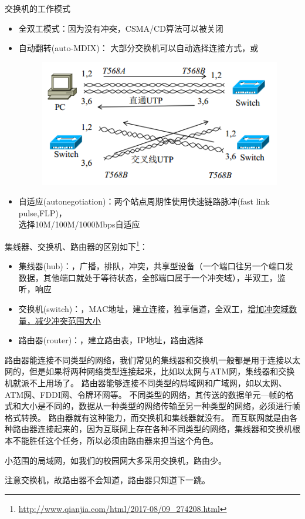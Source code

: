 \myhline
交换机的工作模式
\begin{itemize}
\item 全双工模式：因为没有冲突，CSMA/CD算法可以被关闭
\item 自动翻转(auto-MDIX)：
大部分交换机可以自动选择连接方式，或
\begin{figure}[H]
	\centering
	\includegraphics[width=0.5\linewidth]{fig/auto-MDIX.png}
\end{figure}
\item 自适应(autonegotiation)：两个站点周期性使用快速链路脉冲(fast link pulse,FLP)，\\
选择10M/100M/1000Mbps自适应
\end{itemize}

\myhline
集线器、交换机、路由器的区别如下\footnote{\url{http://www.qianjia.com/html/2017-08/09_274208.html}}：
\begin{itemize}
	\item 集线器(hub)：，广播，排队，冲突，共享型设备（一个端口往另一个端口发数据，其他端口就处于等待状态，全部端口属于一个冲突域），半双工，监听，响应
	\item 交换机(switch)：，MAC地址，建立连接，独享信道，全双工，\underline{增加冲突域数量，减少冲突范围大小}
	\item 路由器(router)：，建立路由表，IP地址，路由选择
\end{itemize}

路由器能连接不同类型的网络，我们常见的集线器和交换机一般都是用于连接以太网的，但是如果将两种网络类型连接起来，比如以太网与ATM网，集线器和交换机就派不上用场了。
路由器能够连接不同类型的局域网和广域网，如以太网、ATM网、FDDI网、令牌环网等。
不同类型的网络，其传送的数据单元---帧的格式和大小是不同的，数据从一种类型的网络传输至另一种类型的网络，必须进行帧格式转换。
路由器就有这种能力，而交换机和集线器就没有。
而互联网就是由各种路由器连接起来的，因为互联网上存在各种不同类型的网络，集线器和交换机根本不能胜任这个任务，所以必须由路由器来担当这个角色。

小范围的局域网，如我们的校园网大多采用交换机，路由少。

注意交换机，故路由器不会知道，路由器只知道下一跳。